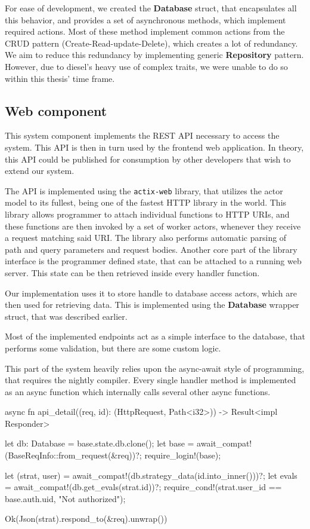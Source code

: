 For ease of development, we created the \textbf{Database} struct, that encapsulates all this behavior, and provides
a set of asynchronous methods, which implement required actions. Most of these method implement common actions
from the CRUD pattern (Create-Read-update-Delete), which creates a lot of redundancy. We aim to reduce this redundancy
by implementing generic \textbf{Repository} pattern. However, due to diesel's heavy use of complex traits, we
were unable to do so within this thesis' time frame.

\subsection{Web component}
This system component implements the REST API necessary to access the system. This API is then
in turn used by the frontend web application. In theory, this API could be published for consumption by
other developers that wish to extend our system.

The API is implemented using the \verb|actix-web| library, that utilizes the actor model to its fullest,
being one of the fastest HTTP library in the world\cite{techempower_benchmark}. This library
allows programmer to attach individual functions to HTTP URIs, and these functions are then invoked by a
set of worker actors, whenever they receive a request matching said URI. The library also performs automatic parsing
of path and query parameters and request bodies. Another core part of the library interface is the programmer defined
state, that can be attached to a running web server. This state can be then retrieved inside every handler function.

Our implementation uses it to store handle to database access actors, which are then used for retrieving data.
This is implemented using the \textbf{Database} wrapper struct, that was described earlier.

Most of the implemented endpoints act as a simple interface to the database, that performs some validation, but there
are some custom logic.

This part of the system heavily relies upon the async-await style of programming, that requires the nightly compiler.
Every single handler method is implemented as an async function which internally calls several other async functions.

\begin{code}[language=rust,label={web_handler},caption={Example web handler function}]
async fn api_detail((req, id): (HttpRequest, Path<i32>)) -> Result<impl Responder> {
    let db: Database = base.state.db.clone();
    let base = await_compat!(BaseReqInfo::from_request(&req))?;
    require_login!(base);

    let (strat, user) = await_compat!(db.strategy_data(id.into_inner()))?;
    let evals = await_compat!(db.get_evals(strat.id))?;
    require_cond!(strat.user_id == base.auth.uid, "Not authorized");

    Ok(Json(strat).respond_to(&req).unwrap())
}
\end{code}

